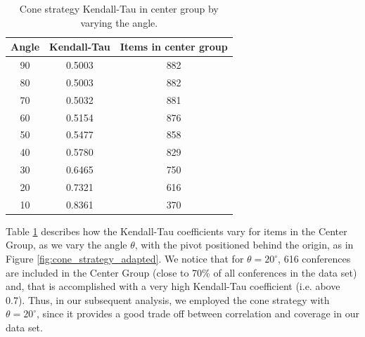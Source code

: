 \documentclass[man,floatsintext]{apa6}
\begin{document}
\begin{table}[h!]
\centering
 \begin{tabular}{c c c} 
 \toprule
 Angle & Kendall-Tau & Items in center group \\ 
 \midrule
 
 90 & 0.5003 & 882 \\
 80 & 0.5003 & 882 \\
 70 & 0.5032 & 881 \\
 60 & 0.5154 & 876 \\
 50 & 0.5477 & 858 \\
 40 & 0.5780 & 829 \\
 30 & 0.6465 & 750 \\
 20 & 0.7321 & 616 \\
 10 & 0.8361 & 370 \\
 \bottomrule
 \end{tabular}
 \caption{Cone strategy Kendall-Tau in center group by varying the angle.}
 \label{tab:cone_strategy}
\end{table}

Table \ref{tab:cone_strategy} describes how the Kendall-Tau coefficients vary for items in the Center Group, as we vary the angle $ \theta $, with the pivot positioned behind the origin, as in Figure \ref{fig:cone_strategy_adapted}. We notice that for $ \theta = 20^{\circ} $, 616 conferences are included in the Center
Group (close to 70\% of all conferences in the data set) and, that is accomplished with a very high Kendall-Tau 
coefficient (i.e. above 0.7). Thus, in our subsequent 
analysis, we employed the cone strategy with $ \theta = 20^{\circ} $, since it provides a good trade off between correlation and coverage in our data set.
\end{document}
